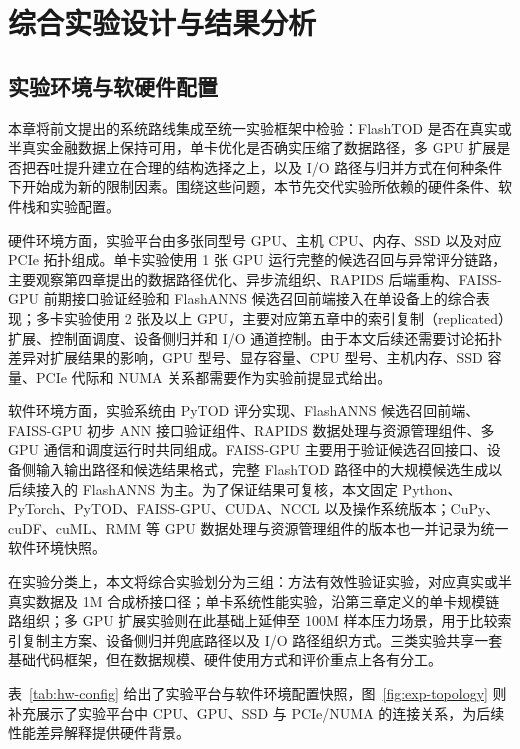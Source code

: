 
\chapter{综合实验设计与结果分析}

\section{实验环境与软硬件配置}

本章将前文提出的系统路线集成至统一实验框架中检验：FlashTOD 是否在真实或半真实金融数据上保持可用，单卡优化是否确实压缩了数据路径，多 GPU 扩展是否把吞吐提升建立在合理的结构选择之上，以及 I/O 路径与归并方式在何种条件下开始成为新的限制因素。围绕这些问题，本节先交代实验所依赖的硬件条件、软件栈和实验配置。

硬件环境方面，实验平台由多张同型号 GPU、主机 CPU、内存、SSD 以及对应 PCIe 拓扑组成。单卡实验使用 1 张 GPU 运行完整的候选召回与异常评分链路，主要观察第四章提出的数据路径优化、异步流组织、RAPIDS 后端重构、FAISS-GPU 前期接口验证经验和 FlashANNS 候选召回前端接入在单设备上的综合表现；多卡实验使用 2 张及以上 GPU，主要对应第五章中的索引复制（replicated）扩展、控制面调度、设备侧归并和 I/O 通道控制。由于本文后续还需要讨论拓扑差异对扩展结果的影响，GPU 型号、显存容量、CPU 型号、主机内存、SSD 容量、PCIe 代际和 NUMA 关系都需要作为实验前提显式给出。

软件环境方面，实验系统由 PyTOD 评分实现、FlashANNS 候选召回前端、FAISS-GPU 初步 ANN 接口验证组件、RAPIDS 数据处理与资源管理组件、多 GPU 通信和调度运行时共同组成。FAISS-GPU 主要用于验证候选召回接口、设备侧输入输出路径和候选结果格式，完整 FlashTOD 路径中的大规模候选生成以后续接入的 FlashANNS 为主。为了保证结果可复核，本文固定 Python、PyTorch、PyTOD、FAISS-GPU、CUDA、NCCL 以及操作系统版本；CuPy、cuDF、cuML、RMM 等 GPU 数据处理与资源管理组件的版本也一并记录为统一软件环境快照。

在实验分类上，本文将综合实验划分为三组：方法有效性验证实验，对应真实或半真实数据及 1M 合成桥接口径；单卡系统性能实验，沿第三章定义的单卡规模链路组织；多 GPU 扩展实验则在此基础上延伸至 100M 样本压力场景，用于比较索引复制主方案、设备侧归并兜底路径以及 I/O 路径组织方式。三类实验共享一套基础代码框架，但在数据规模、硬件使用方式和评价重点上各有分工。

表~\ref{tab:hw-config} 给出了实验平台与软件环境配置快照，图~\ref{fig:exp-topology} 则补充展示了实验平台中 CPU、GPU、SSD 与 PCIe/NUMA 的连接关系，为后续性能差异解释提供硬件背景。

